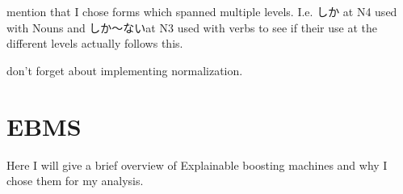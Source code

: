 mention that I chose forms which spanned multiple levels. I.e. しか at N4 used with Nouns and しか〜ないat N3 used
with verbs to see if their use at the different levels actually follows this.

don't forget about implementing normalization.

\section{EBMS}
 Here I will give a brief overview of Explainable boosting machines and why I chose them for my analysis.


